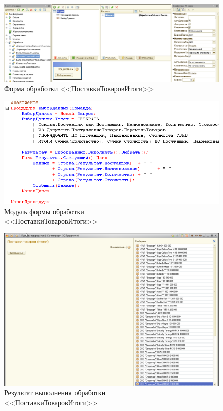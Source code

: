 \begin{figure}[h!]
  \centering
  \includegraphics[width=150mm]{pic/query_input_form}
  \caption{Форма обработки <<ПоставкиТоваровИтоги>>}
  \label{fig:query_input_form}
\end{figure}

\begin{figure}[h!]
  \centering
  \includegraphics[width=130mm]{pic/query_input_module}
  \caption{Модуль формы обработки \\ <<ПоставкиТоваровИтоги>>}
  \label{fig:query_input_module}
\end{figure}

\begin{figure}[h!]
  \centering
  \includegraphics[width=150mm]{pic/query_input_result}
  \caption{Результат выполнения обработки \\ <<ПоставкиТоваровИтоги>>}
  \label{fig:query_input_result}
\end{figure}

